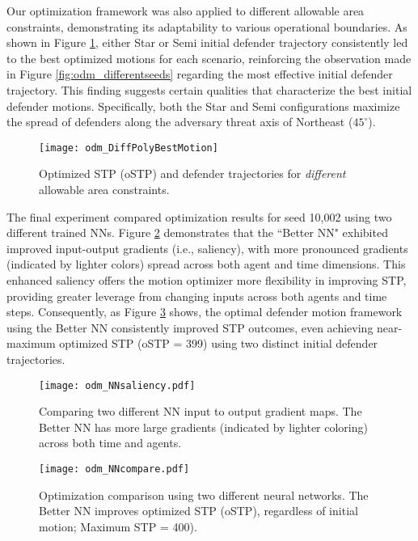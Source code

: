 \documentclass[journal]{IEEEtran} %
\begin{document}
Our optimization framework was also applied to different allowable area constraints, demonstrating its adaptability to various operational boundaries. As shown in Figure \ref{fig:odm_DiffPolyBestMotion}, either Star or Semi initial defender trajectory consistently led to the best optimized motions for each scenario, reinforcing the observation made in Figure \ref{fig:odm_differentseeds} regarding the most effective initial defender trajectory. This finding suggests certain qualities that characterize the best initial defender motions. Specifically, both the Star and Semi configurations maximize the spread of defenders along the adversary threat axis of Northeast ($45^\circ$).

\begin{figure}[h]
    \centering
    \texttt{[image: odm\_DiffPolyBestMotion]}
    \caption{Optimized STP (oSTP) and defender trajectories for \textit{different} allowable area constraints.}
    \label{fig:odm_DiffPolyBestMotion}
\end{figure}

The final experiment compared optimization results for seed 10,002 using two different trained NNs. Figure \ref{fig:odm_NNsaliency} demonstrates that the ``Better NN" exhibited improved input-output gradients (i.e., saliency), with more pronounced gradients (indicated by lighter colors) spread across both agent and time dimensions. This enhanced saliency offers the motion optimizer more flexibility in improving STP, providing greater leverage from changing inputs across both agents and time steps. Consequently, as Figure \ref{fig:odm_NNcompare} shows, the optimal defender motion framework using the Better NN consistently improved STP outcomes, even achieving near-maximum optimized STP (oSTP = 399) using two distinct initial defender trajectories.

\begin{figure}[h]
    \centering
    \texttt{[image: odm\_NNsaliency.pdf]}
    \caption{Comparing two different NN input to output gradient maps. The Better NN has more large gradients (indicated by lighter coloring) across both time and agents.}
    \label{fig:odm_NNsaliency}
\end{figure}

\begin{figure}[h]
    \centering
    \texttt{[image: odm\_NNcompare.pdf]}
    \caption{Optimization comparison using two different neural networks. The Better NN improves optimized STP (oSTP), regardless of initial motion; Maximum STP = 400).}
    \label{fig:odm_NNcompare}
\end{figure}
\end{document}
